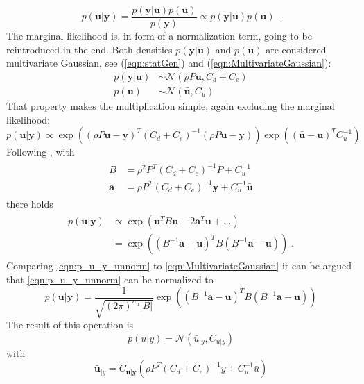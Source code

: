 \documentclass[%
  a4paper,oneside,%
  11pt,%
  smallchapters,
  style=printdev,
  extramargin,
  green,%
  rgb, <cmyk>
  ]{tubsbook}
\begin{document}
\begin{equation}
p(\bm{u}|\bm{y}) = \frac{p(\bm{y}|\bm{u})p(\bm{u})}{p(\bm{y})} \propto p(\bm{y}|\bm{u})p(\bm{u}) \;.
\label{eqn:bayesPrior}
\end{equation}
The marginal likelihood is, in form of a normalization term, going to be reintroduced in the end. Both densities $p(\bm{y}|\bm{u})$ and $p(\bm{u})$ are considered multivariate Gaussian, see (\ref{eqn:statGen}) and (\ref{eqn:MultivariateGaussian}):
\begin{align}
p(\bm{y}|\bm{u}) &\sim \mathcal{N} (\rho P \bm{u}, C_d + C_e) \\
p(\bm{u}) &\sim \mathcal{N}(\bm{\bar{u}},C_u)
\end{align}
%
That property makes the multiplication simple, again excluding the marginal likelihood:
\begin{equation}
p(\bm{u}|\bm{y}) \propto  \exp(  (\rho P \bm{u} -\bm{y})^T (C_d + C_e)^{-1} (\rho P \bm{u} -\bm{y})  ) \exp(  (\bar{\bm{u}} - \bm{u})^T C_u^{-1}  )
\end{equation}
Following \cite{girolami2021}, with
\begin{align}
\begin{split}
B &= \rho^2 P^T (C_d +C_e)^{-1} P + C_u^{-1} \\
\bm{a} &= \rho P^T (C_d +C_e)^{-1} \bm{y} + C_u^{-1} \bm{\bar{u}}
\end{split}
\end{align}
there holds
\begin{align}
\begin{split}
p(\bm{u}|\bm{y}) &\propto \exp(\bm{u}^T B \bm{u} - 2\bm{a}^T\bm{u} + ... ) \\
&= \exp( (B^{-1} \bm{a} - \bm{u} )^T  B (B^{-1} \bm{a} - \bm{u} ) ) \;.
\label{eqn:p_u_y_unnorm}
\end{split}
\end{align}
Comparing \ref{eqn:p_u_y_unnorm} to \ref{eqn:MultivariateGaussian} it can be argued that \ref{eqn:p_u_y_unnorm} can be normalized to 
\begin{equation}
p(\bm{u}|\bm{y}) = \frac{1}{\sqrt{(2\pi)^{n_u} \lvert B \rvert}} \exp( (B^{-1} \bm{a} - \bm{u} )^T  B (B^{-1} \bm{a} - \bm{u} ) )
\end{equation} 
%
The result of this operation is
%
\begin{equation}
p(u|y) = \mathcal{N}(\bar{u}_{|y}, C_{u|y})
\label{eqn:statFEMConditioned}
\end{equation}
%
with
%
\begin{equation}
\bm{\bar{u}}_{|y} = C_{\bm{u}|\bm{y}} \left(   \rho P^T  (C_d + C_e)^{-1}  y  +  C_u^{-1}  \bar{u}   \right)
\end{equation}
\end{document}
